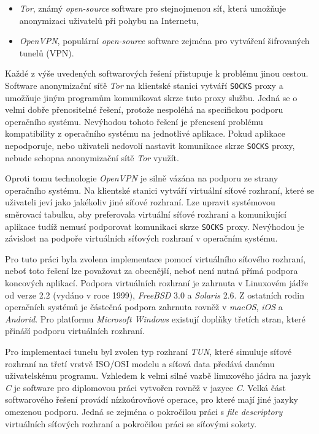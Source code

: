 \documentclass[thesis=M,czech]{FITthesis}[2012/10/20]
\begin{document}
\begin{itemize}
 \item \textit{Tor}, známý \textit{open-source} software pro stejnojmenou síť, která umožňuje anonymizaci uživatelů při pohybu na Internetu,
 \item \textit{OpenVPN}, populární \textit{open-source} software zejména pro vytváření šifrovaných tunelů (VPN).
\end{itemize}

Každé z výše uvedených softwarových řešení přistupuje k problému jinou cestou. Software anonymizační síťě \textit{Tor} na klientské stanici vytváří \texttt{SOCKS} proxy a umožňuje jiným programům komunikovat skrze tuto proxy službu. Jedná se o velmi dobře přenositelné řešení, protože nespoléhá na specifickou podporu operačního systému. Nevýhodou tohoto řešení je přenesení problému kompatibility z operačního systému na jednotlivé aplikace. Pokud aplikace nepodporuje, nebo uživateli nedovolí nastavit komunikace skrze \texttt{SOCKS} proxy, nebude schopna anonymizační sítě \textit{Tor} využít.

Oproti tomu technologie \textit{OpenVPN} je silně vázána na podporu ze strany operačního systému. Na klientské stanici vytváří virtuální síťové rozhraní, které se uživateli jeví jako jakékoliv jiné síťové rozhraní. Lze upravit systémovou směrovací tabulku, aby preferovala virtuální síťové rozhraní a komunikující aplikace tudíž nemusí podporovat komunikaci skrze \texttt{SOCKS} proxy. Nevýhodou je závislost na podpoře virtuálních síťových rozhraní v operačním systému.

Pro tuto práci byla zvolena implementace pomocí virtuálního síťového rozhraní, neboť toto řešení lze považovat za obecnější, neboť není nutná přímá podpora koncových aplikací. Podpora virtuálních rozhraní je zahrnuta v Linuxovém jádře od verze 2.2 (vydáno v roce 1999), \textit{FreeBSD} 3.0 a \textit{Solaris} 2.6. Z ostatních rodin operačních systémů je částečná podpora zahrnuta rovněž v \textit{macOS}, \textit{iOS} a \textit{Andorid}. Pro platformu \textit{Microsoft Windows} existují doplňky třetích stran, které přináší podporu virtuálních rozhraní.

Pro implementaci tunelu byl zvolen typ rozhraní \textit{TUN}, které simuluje síťové rozhraní na třetí vrstvě ISO/OSI modelu a síťová data předává danému uživatelskému programu. Vzhledem k velmi silné vazbě linuxového jádra na jazyk \textit{C} je software pro diplomovou práci vytvořen rovněž v jazyce \textit{C}. Velká část softwarového řešení provádí nízkoúrovňové operace, pro které mají jiné jazyky omezenou podporu. Jedná se zejména o pokročilou práci s \textit{file descriptory} virtuálních síťových rozhraní a pokročilou práci se síťovými sokety.
\end{document}
